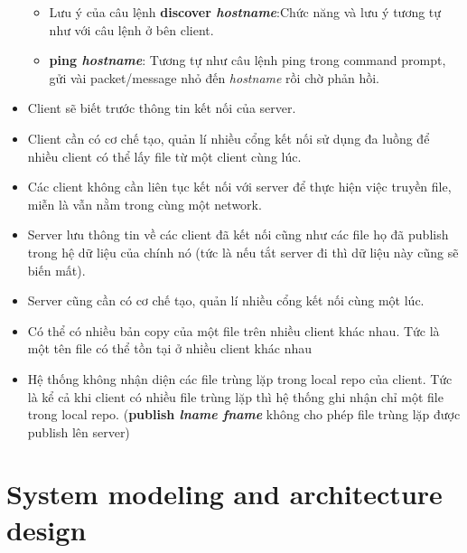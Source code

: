 \documentclass[a4paper]{article}
\begin{document}
\begin{itemize}
		\begin{itemize}
			\item Lưu ý của câu lệnh \textbf{discover \textit{hostname}}:Chức năng và lưu ý tương tự như với câu lệnh ở bên client. 
			\item \textbf{ping \textit{hostname}}: Tương tự như câu lệnh ping trong command prompt, gửi vài packet/message nhỏ đến \textit{hostname} rồi chờ phản hồi.
		\end{itemize}
		\item Client sẽ biết trước thông tin kết nối của server.
		\item Client cần có cơ chế tạo, quản lí nhiều cổng kết nối sử dụng đa luồng để nhiều client có thể lấy file từ một client cùng lúc.
		\item Các client không cần liên tục kết nối với server để thực hiện việc truyền file, miễn là vẫn nằm trong cùng một network.
		\item Server lưu thông tin về các client đã kết nối cũng như các file họ đã publish trong hệ dữ liệu của chính nó (tức là nếu tắt server đi thì dữ liệu này cũng sẽ biến mất).
		\item Server cũng cần có cơ chế tạo, quản lí nhiều cổng kết nối cùng một lúc.
		\item Có thể có nhiều bản copy của một file trên nhiều client khác nhau. Tức là một tên file có thể tồn tại ở nhiều client khác nhau
		\item Hệ thống không nhận diện các file trùng lặp trong local repo của client. Tức là kể cả khi client có nhiều file trùng lặp thì hệ thống ghi nhận chỉ một file trong local repo. (\textbf{publish \textit{lname fname}} không cho phép file trùng lặp được publish lên server)
	\end{itemize}
	
	\section{System modeling and architecture design}
\end{document}
